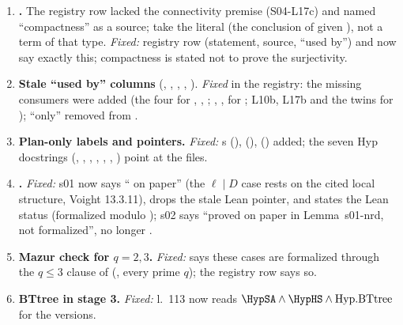 \begin{enumerate}[leftmargin=1.6em,label=(I\arabic*),ref=I\arabic*]
\item\label{inc:invlim} \textbf{.} The registry row lacked the connectivity premise (S04-L17c) and
  named ``compactness'' as a source;  take the literal 
  (the conclusion of  given ), not a term of that type. \emph{Fixed:} registry row
  (statement, source, ``used by'') and  now say exactly this; compactness is stated not to
  prove the surjectivity.
\item\label{inc:usedby} \textbf{Stale ``used by'' columns} (, , , ,
  ). \emph{Fixed} in the registry: the missing consumers were added (the four
   for , , ; , ,
   for ; L10b, L17b and the  twins for
  ); ``only'' removed from .
\item\label{inc:planstaged} \textbf{Plan-only labels and  pointers.} \emph{Fixed:} s
   (),  (), 
  () added; the seven Hyp docstrings (, , ,
  , , , ) point at the  files.
\item\label{inc:nrd} \textbf{.} \emph{Fixed:} s01 now says ``\stproved{} on paper'' (the $\ell\mid D$ case rests
  on the cited local structure, Voight 13.3.11), drops the stale Lean pointer, and states the Lean status (formalized
  modulo ); s02 says ``proved on paper in Lemma~s01-nrd, not formalized'', no longer \stcited.
\item\label{inc:mazur} \textbf{Mazur check for $q=2,3$.} \emph{Fixed:}  says these cases are formalized
  through the $q\le3$ clause of  (, every prime $q$); the registry row says so.
\item\label{inc:bt} \textbf{BTtree in stage 3.} \emph{Fixed:}  l.~113 now reads
  $\HypSA\wedge\HypHS\wedge\mathrm{Hyp.BTtree}$ for the  versions.

\end{enumerate}
